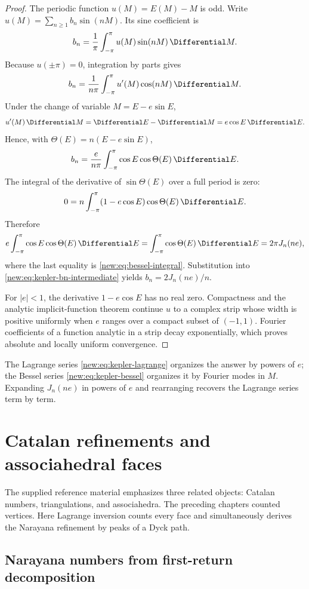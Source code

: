 \documentclass[11pt,a4paper,oneside,openany]{book}
\theoremstyle{definition}
\theoremstyle{remark}
\begin{document}
\begin{proof}
The periodic function $u(M)=E(M)-M$ is odd.  Write
$u(M)=\sum_{n\ge1}b_n\sin(nM)$.  Its sine coefficient is
\[
 b_n=\frac1\pi\int_{-\pi}^{\pi}u(M)\sin(nM)\,\Differential M.
\]
Because $u(\pm\pi)=0$, integration by parts gives
\[
 b_n=\frac1{n\pi}\int_{-\pi}^{\pi}u'(M)\cos(nM)\,\Differential M.
\]
Under the change of variable $M=E-e\sin E$,
\[
 u'(M)\,\Differential M=\Differential E-\Differential M=e\cos E\,\Differential E.
\]
Hence, with $\Theta(E)=n(E-e\sin E)$,
\begin{equation}
 b_n=\frac{e}{n\pi}\int_{-\pi}^{\pi}
 \cos E\cos\Theta(E)\,\Differential E.
 \label{new:eq:kepler-bn-intermediate}
\end{equation}
The integral of the derivative of $\sin\Theta(E)$ over a full period is zero:
\[
 0=n\int_{-\pi}^{\pi}(1-e\cos E)\cos\Theta(E)\,\Differential E.
\]
Therefore
\[
 e\int_{-\pi}^{\pi}\cos E\cos\Theta(E)\,\Differential E
 =\int_{-\pi}^{\pi}\cos\Theta(E)\,\Differential E
 =2\pi J_n(ne),
\]
where the last equality is \eqref{new:eq:bessel-integral}.  Substitution into
\eqref{new:eq:kepler-bn-intermediate} yields $b_n=2J_n(ne)/n$.

For $|e|<1$, the derivative $1-e\cos E$ has no real zero.  Compactness and the
analytic implicit-function theorem continue $u$ to a complex strip whose width
is positive uniformly when $e$ ranges over a compact subset of $(-1,1)$.
Fourier coefficients of a function analytic in a strip decay exponentially,
which proves absolute and locally uniform convergence.
\end{proof}

The Lagrange series \eqref{new:eq:kepler-lagrange} organizes the answer by
powers of $e$; the Bessel series \eqref{new:eq:kepler-bessel} organizes it by
Fourier modes in $M$.  Expanding $J_n(ne)$ in powers of $e$ and rearranging
recovers the Lagrange series term by term.

\chapter{Catalan refinements and associahedral faces}
\label{ch:associahedron-refinements}

The supplied reference material emphasizes three related objects: Catalan
numbers, triangulations, and associahedra.  The preceding chapters counted
vertices.  Here Lagrange inversion counts every face and simultaneously derives
the Narayana refinement by peaks of a Dyck path.

\section{Narayana numbers from first-return decomposition}
\end{document}
